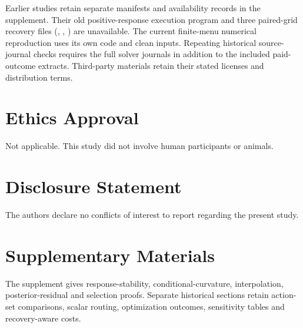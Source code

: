 \documentclass[]{interact}
\begin{document}
Earlier studies retain separate manifests and availability records in the supplement. Their old positive-response execution program and three paired-grid recovery files (, , ) are unavailable. The current finite-menu numerical reproduction uses its own code and clean inputs. Repeating historical source-journal checks requires the full solver journals in addition to the included paid-outcome extracts. Third-party materials retain their stated licenses and distribution terms.

\section*{Ethics Approval}

Not applicable. This study did not involve human participants or animals.

\section*{Disclosure Statement}

The authors declare no conflicts of interest to report regarding the present study.

\section*{Supplementary Materials}

The supplement gives response-stability, conditional-curvature, interpolation, posterior-residual and selection proofs. Separate historical sections retain action-set comparisons, scalar routing, optimization outcomes, sensitivity tables and recovery-aware costs.


\end{document}
